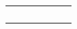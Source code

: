 \begin{table}[h]
\begin{tabular}{clcllc}
                                                                  &                                                                               &                          & \multicolumn{2}{l}{}                                                                                                                                                                                 &                                                                                                                          \\
                                                                  &                                                                               &                          & \multicolumn{2}{l}{}                                                                                                                                                                                 &                                                                                                                          \\
                                                                  &                                                                               &                          & \multicolumn{2}{l}{}                                                                                                                                                                                 &                                                                                                                          \\
\multicolumn{1}{l}{}                                              &                                                                               & \multicolumn{1}{l}{}     &                                                                                                   &                                                                                                  & \multicolumn{1}{l}{}                                                                                                    
\\
\bottomrule
\hline                                                                        
\end{tabular}
\label{tab:Ensayo1}
\end{table}


